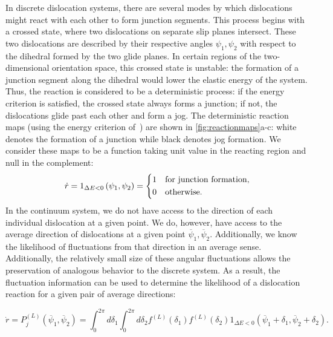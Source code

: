 In discrete dislocation systems, there are several modes by which dislocations might react with each other to form junction segments. This process begins with a crossed state, where two dislocations on separate slip planes intersect. These two dislocations are described by their respective angles \(\psi_{1},\psi_{2}\) with respect to the dihedral formed by the two glide planes. In certain regions of the two-dimensional orientation space, this crossed state is unstable: the formation of a junction segment along the dihedral would lower the elastic energy of the system. Thus, the reaction is considered to be a deterministic process:  if the energy criterion is satisfied, the crossed state always forms a junction; if not, the dislocations glide past each other and form a jog. The deterministic reaction maps (using the energy criterion of~\cite{Lin2020,madecNatureAttractiveDislocation2002}) are shown in \cref{fig:reactionmaps}a-c: white denotes the formation of a junction while black denotes jog formation. We consider these maps to be a function taking unit value in the reacting region and null in the complement:
\begin{equation}
\dot r=1_{\Delta E < 0}\left( \psi_{1},\psi_{2} \right) = 
\begin{dcases}
1 & \text{for junction formation},  \\
0 & \text{otherwise}.
\end{dcases} 
\end{equation}
In the continuum system, we do not have access to the direction of each individual dislocation at a given point. We do, however, have access to the average direction of dislocations at a given point \({\overline{\psi}}_{1},{\overline{\psi}}_{2}\). Additionally, we know the likelihood of fluctuations from that direction in an average sense. {Additionally, the relatively small size of these angular fluctuations allows the preservation of analogous behavior to the discrete system. As a result, the fluctuation information can be used to determine the likelihood of a dislocation reaction for a given pair of average directions:}
\begin{widetext}
\begin{equation}
\dot{r} =P_{j}^{(L)}\left( {\overline{\psi}}_{1},{\overline{\psi}}_{2} \right) = \int_{0}^{2\pi}{d\delta_{1}\int_{0}^{2\pi}{d\delta_{2}}f^{(L)}\left( \delta_{1} \right)f^{(L)}\left( \delta_{2} \right)1_{\Delta E < 0}\left( \overline{\psi}_{1} + \delta_{1},{\overline{\psi}}_{2} + \delta_{2} \right)}.
\end{equation}
\end{widetext}
